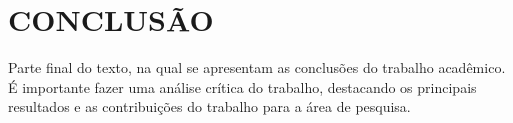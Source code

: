 % 
%


\chapter{CONCLUSÃO}
\label{chap:conclusao}

Parte final do texto, na qual se apresentam as conclusões do trabalho acadêmico. É importante fazer uma análise crítica do trabalho, destacando os principais resultados e as contribuições do trabalho para a área de pesquisa.

